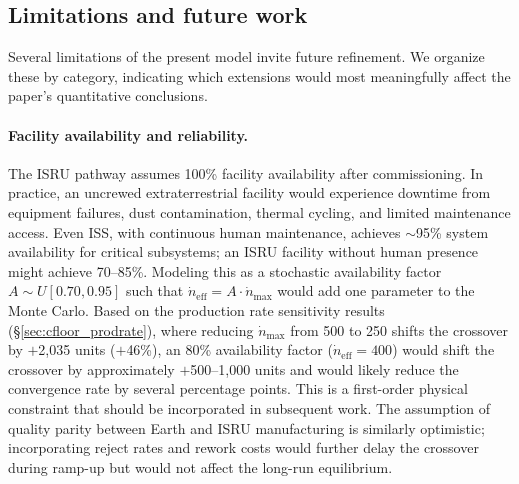 \documentclass[preprint,12pt]{elsarticle}
\begin{document}
\subsection{Limitations and future work}

Several limitations of the present model invite future refinement. We organize these by category, indicating which extensions would most meaningfully affect the paper's quantitative conclusions.

\paragraph{Facility availability and reliability.} The ISRU pathway assumes 100\% facility availability after commissioning. In practice, an uncrewed extraterrestrial facility would experience downtime from equipment failures, dust contamination, thermal cycling, and limited maintenance access. Even ISS, with continuous human maintenance, achieves $\sim$95\% system availability for critical subsystems; an ISRU facility without human presence might achieve 70--85\%. Modeling this as a stochastic availability factor $A \sim U[0.70, 0.95]$ such that $\dot{n}_{\mathrm{eff}} = A \cdot \dot{n}_{\max}$ would add one parameter to the Monte Carlo. Based on the production rate sensitivity results (\S\ref{sec:cfloor_prodrate}), where reducing $\dot{n}_{\max}$ from 500 to 250 shifts the crossover by $+$2{,}035 units ($+$46\%), an 80\% availability factor ($\dot{n}_{\mathrm{eff}} = 400$) would shift the crossover by approximately $+$500--1{,}000 units and would likely reduce the convergence rate by several percentage points. This is a first-order physical constraint that should be incorporated in subsequent work. The assumption of quality parity between Earth and ISRU manufacturing is similarly optimistic; incorporating reject rates and rework costs would further delay the crossover during ramp-up but would not affect the long-run equilibrium.
\end{document}
